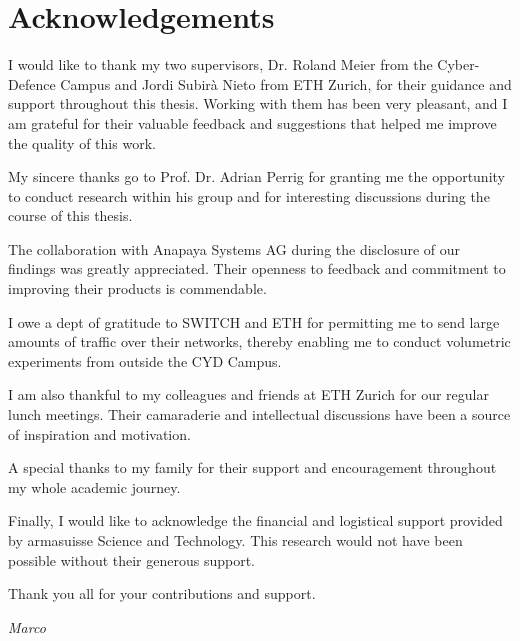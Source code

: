 \chapter*{Acknowledgements}


I would like to thank my two supervisors, Dr. Roland Meier from the Cyber-Defence Campus and Jordi Subirà Nieto from ETH Zurich, for their guidance and support throughout this thesis.
Working with them has been very pleasant, and I am grateful for their valuable feedback and suggestions that helped me improve the quality of this work.

My sincere thanks go to Prof. Dr. Adrian Perrig for granting me the opportunity to conduct research within his group and for interesting discussions during the course of this thesis.

The collaboration with Anapaya Systems AG during the disclosure of our findings was greatly appreciated.
Their openness to feedback and commitment to improving their products is commendable.

I owe a dept of gratitude to SWITCH and ETH for permitting me to send large amounts of traffic over their networks, thereby enabling me to conduct volumetric experiments from outside the CYD Campus.

I am also thankful to my colleagues and friends at ETH Zurich for our regular lunch meetings.
Their camaraderie and intellectual discussions have been a source of inspiration and motivation.

A special thanks to my family for their support and encouragement throughout my whole academic journey.

Finally, I would like to acknowledge the financial and logistical support provided by armasuisse Science and Technology.
This research would not have been possible without their generous support.

Thank you all for your contributions and support.

\begin{flushright}
\textit{Marco}
\end{flushright}
